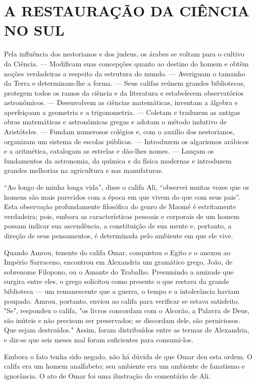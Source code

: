 \documentclass[11pt,a5paper,twoside,openany]{book}
\begin{document}
\section*{A RESTAURAÇÃO DA CIÊNCIA NO SUL}
Pela influência dos nestorianos e dos judeus, os árabes se voltam para o cultivo da Ciência. — Modificam suas concepções quanto ao destino do homem e obtêm noções verdadeiras a respeito da estrutura do mundo. — Averiguam o tamanho da Terra e determinam-lhe a forma. — Seus califas reúnem grandes bibliotecas, protegem todos os ramos da ciência e da literatura e estabelecem observatórios astronômicos. — Desenvolvem as ciências matemáticas, inventam a álgebra e aperfeiçoam a geometria e a trigonometria. — Coletam e traduzem as antigas obras matemáticas e astronômicas gregas e adotam o método indutivo de Aristóteles. — Fundam numerosos colégios e, com o auxílio dos nestorianos, organizam um sistema de escolas públicas. — Introduzem os algarismos arábicos e a aritmética, catalogam as estrelas e dão-lhes nomes. — Lançam os fundamentos da astronomia, da química e da física modernas e introduzem grandes melhorias na agricultura e nas manufaturas.

“Ao longo de minha longa vida”, disse o califa Ali, “observei muitas vezes que os homens são mais parecidos com a época em que vivem do que com seus pais”. Esta observação profundamente filosófica do genro de Maomé é estritamente verdadeira; pois, embora as características pessoais e corporais de um homem possam indicar sua ascendência, a constituição de sua mente e, portanto, a direção de seus pensamentos, é determinada pelo ambiente em que ele vive.

Quando Amrou, tenente do califa Omar, conquistou o Egito e o anexou ao Império Sarraceno, encontrou em Alexandria um gramático grego, João, de sobrenome Filopono, ou o Amante do Trabalho. Presumindo a amizade que surgira entre eles, o grego solicitou como presente o que restava da grande biblioteca — um remanescente que a guerra, o tempo e a intolerância haviam poupado. Amrou, portanto, enviou ao califa para verificar se estava satisfeito. "Se", respondeu o califa, "os livros concordam com o Alcorão, a Palavra de Deus, são inúteis e não precisam ser preservados; se discordam dele, são perniciosos. Que sejam destruídos." Assim, foram distribuídos entre as termas de Alexandria, e diz-se que seis meses mal foram suficientes para consumi-los.

Embora o fato tenha sido negado, não há dúvida de que Omar deu esta ordem. O califa era um homem analfabeto; seu ambiente era um ambiente de fanatismo e ignorância. O ato de Omar foi uma ilustração do comentário de Ali.
\end{document}
